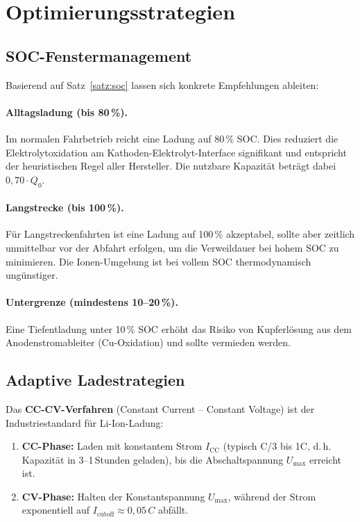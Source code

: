 ﻿\documentclass[a4paper,12pt]{article}
\theoremstyle{definition}
\begin{document}
\section{Optimierungsstrategien}

\subsection{SOC-Fenstermanagement}

Basierend auf Satz~\ref{satz:soc} lassen sich konkrete Empfehlungen ableiten:

\paragraph{Alltagsladung (bis 80\,\%).}
Im normalen Fahrbetrieb reicht eine Ladung auf 80\,\% SOC. Dies reduziert
die Elektrolytoxidation am Kathoden-Elektrolyt-Interface signifikant und
entspricht der heuristischen Regel aller Hersteller.
Die nutzbare Kapazit\"at betr\"agt dabei $0{,}70 \cdot Q_0$.

\paragraph{Langstrecke (bis 100\,\%).}
F\"ur Langstreckenfahrten ist eine Ladung auf 100\,\% akzeptabel, sollte
aber zeitlich unmittelbar vor der Abfahrt erfolgen, um die Verweildauer
bei hohem SOC zu minimieren. Die Ionen-Umgebung ist bei vollem SOC
thermodynamisch ung\"unstiger.

\paragraph{Untergrenze (mindestens 10--20\,\%).}
Eine Tiefentladung unter 10\,\% SOC erh\"oht das Risiko von Kupferl\"osung
aus dem Anodenstromableiter (Cu-Oxidation) und sollte vermieden werden.

\subsection{Adaptive Ladestrategien}

Das \textbf{CC-CV-Verfahren} (Constant Current -- Constant Voltage) ist
der Industriestandard f\"ur Li-Ion-Ladung:

\begin{enumerate}
  \item \textbf{CC-Phase:} Laden mit konstantem Strom $I_{\mathrm{CC}}$
    (typisch C/3 bis 1C, d.\,h. Kapazit\"at in 3--1\,Stunden geladen),
    bis die Abschaltspannung $U_{\max}$ erreicht ist.
  \item \textbf{CV-Phase:} Halten der Konstantspannung $U_{\max}$,
    w\"ahrend der Strom exponentiell auf $I_{\mathrm{cutoff}} \approx 0{,}05\,C$
    abf\"allt.
\end{enumerate}
\end{document}
